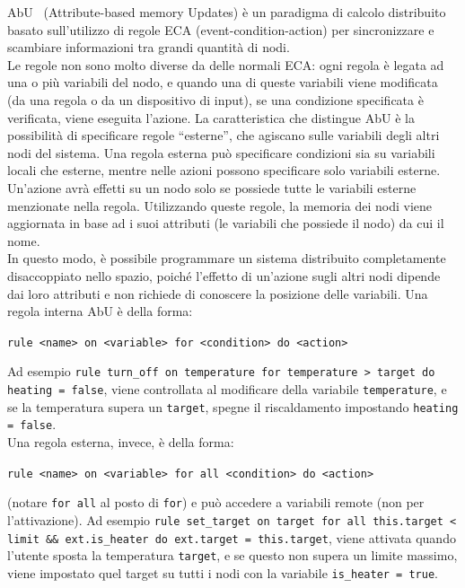 \documentclass[12pt, a4paper]{article}
\begin{document}
AbU~\cite{MP-ICTAC-2021} (Attribute-based memory Updates) è un paradigma di calcolo distribuito basato sull'utilizzo di regole ECA (event-condition-action) per sincronizzare e scambiare informazioni tra grandi quantità di nodi.\\
Le regole non sono molto diverse da delle normali ECA: ogni regola è legata ad una o più variabili del nodo, e quando una di queste variabili viene modificata (da una regola o da un dispositivo di input), se una condizione specificata è verificata, viene eseguita l'azione.
La caratteristica che distingue AbU è la possibilità di specificare regole ``esterne'', che agiscano sulle variabili degli altri nodi del sistema. Una regola esterna può specificare condizioni sia su variabili locali che esterne, mentre nelle azioni possono specificare solo variabili esterne. Un'azione avrà effetti su un nodo solo se possiede tutte le variabili esterne menzionate nella regola.
Utilizzando queste regole, la memoria dei nodi viene aggiornata in base ad i suoi attributi (le variabili che possiede il nodo) da cui il nome.\\
In questo modo, è possibile programmare un sistema distribuito completamente disaccoppiato nello spazio, poiché l'effetto di un'azione sugli altri nodi dipende dai loro attributi e non richiede di conoscere la posizione delle variabili.
Una regola interna AbU è della forma:
\begin{center}
    \lstinline{rule <name> on <variable> for <condition> do <action>}
\end{center}
Ad esempio \lstinline{rule turn_off on temperature for temperature > target do heating = false}, viene controllata al modificare della variabile \lstinline{temperature}, e se la temperatura supera un \lstinline{target}, spegne il riscaldamento impostando \lstinline{heating = false}.\\
Una regola esterna, invece, è della forma:
\begin{center}
    \lstinline{rule <name> on <variable> for all <condition> do <action>}
\end{center}
(notare \lstinline{for all} al posto di \lstinline{for}) e può accedere a variabili remote (non per l'attivazione). Ad esempio \lstinline{rule set_target on target for all this.target < limit && ext.is_heater do ext.target = this.target}, viene attivata quando l'utente sposta la temperatura \lstinline{target}, e se questo non supera un limite massimo, viene impostato quel target su tutti i nodi con la variabile \lstinline{is_heater = true}.
\end{document}
